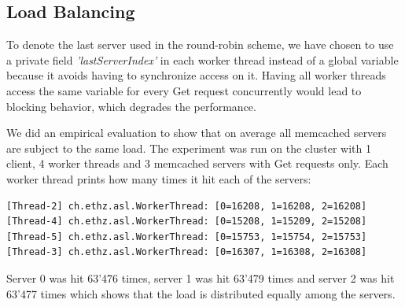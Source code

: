 \subsection{Load Balancing} \label{sub:lb}
To denote the last server used in the round-robin scheme, we have chosen to use a private field \textit{'lastServerIndex'} in each worker thread instead of a global variable because it avoids having to synchronize access on it. Having all worker threads access the same variable for every Get request concurrently would lead to blocking behavior, which degrades the performance. 

We did an empirical evaluation to show that on average all memcached servers are subject to the same load. The experiment was run on the cluster with 1 client, 4 worker threads and 3 memcached servers with Get requests only. Each worker thread prints how many times it hit each of the servers:
\begin{lstlisting}[basicstyle=\tiny]                
[Thread-2] ch.ethz.asl.WorkerThread: [0=16208, 1=16208, 2=16208] 
[Thread-4] ch.ethz.asl.WorkerThread: [0=15208, 1=15209, 2=15208] 
[Thread-5] ch.ethz.asl.WorkerThread: [0=15753, 1=15754, 2=15753] 
[Thread-3] ch.ethz.asl.WorkerThread: [0=16307, 1=16308, 2=16308] 
\end{lstlisting}
Server 0 was hit 63'476 times, server 1 was hit 63'479 times and server 2 was hit 63'477 times which shows that the load is distributed equally among the servers.

